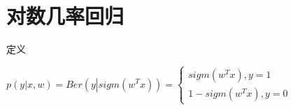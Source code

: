 \documentclass[xetex,mathserif,serif]{beamer}
\begin{document}
\section{对数几率回归}
\begin{frame}{定义}
\begin{block}
    $p\left( {y\left| {x,w} \right.} \right) = Ber\left( {y\left| {sigm\left( {{w^T}x} \right)} \right.} \right) = \left\{ \begin{array}{l}
    sigm\left( {{w^T}x} \right),y = 1\\
    1 - sigm\left( {{w^T}x} \right),y = 0
    \end{array} \right.$
\end{block}

\begin{block}

\end{block}
\end{frame}
\end{document}
